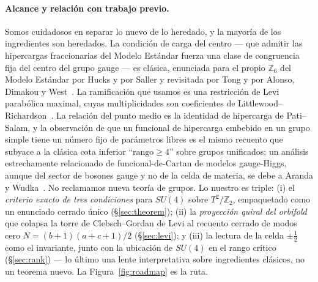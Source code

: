 \documentclass[11pt,a4paper]{article}
\newcommand{\ZZ}{\mathbb{Z}}
\begin{document}
\paragraph{Alcance y relación con trabajo previo.} Somos cuidadosos en separar lo nuevo de lo
heredado, y la mayoría de los ingredientes son heredados. La condición de carga del centro ---
que admitir las hipercargas fraccionarias del Modelo Estándar fuerza una clase de congruencia
fija del centro del grupo gauge --- es clásica, enunciada para el propio $\ZZ_6$ del Modelo
Estándar por Hucks y por Saller y revisitada por Tong y por Alonso, Dimakou y
West~\cite{Hucks,Saller,Tong,Alonso}. La ramificación que usamos es una restricción de Levi
parabólica maximal, cuyas multiplicidades son coeficientes de
Littlewood--Richardson~\cite{Fulton,GW}. La relación del punto medio es la identidad de
hipercarga de Pati--Salam, y la observación de que un funcional de hipercarga embebido en un
grupo simple tiene un número fijo de parámetros libres es el mismo recuento que subyace a la
clásica cota inferior ``$\mathrm{rango}\ge 4$'' sobre grupos unificados; un análisis
estrechamente relacionado de funcional-de-Cartan de modelos gauge-Higgs, aunque del sector de
bosones gauge y no de la celda de materia, se debe a Aranda y Wudka~\cite{ArandaWudka}. No
reclamamos nueva teoría de grupos. Lo nuestro es triple: (i) el \emph{criterio exacto de tres
condiciones} para $SU(4)$ sobre $T^2/\mathbb{Z}_2$, empaquetado como un enunciado cerrado
único (\S\ref{sec:theorem}); (ii) la \emph{proyección quiral del orbifold} que colapsa la
torre de Clebsch--Gordan de Levi al recuento cerrado de modos cero $N=(b+1)(a+c+1)/2$
(\S\ref{sec:levi}); y (iii) la lectura de la celda $\pm\tfrac12$ como el invariante, junto con
la ubicación de $SU(4)$ en el rango crítico (\S\ref{sec:rank}) --- lo último una lente
interpretativa sobre ingredientes clásicos, no un teorema nuevo. La Figura~\ref{fig:roadmap}
es la ruta.
\end{document}
